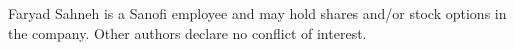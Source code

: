 Faryad Sahneh is a Sanofi employee and may hold shares and/or stock options in the company. Other authors declare no conflict of interest.